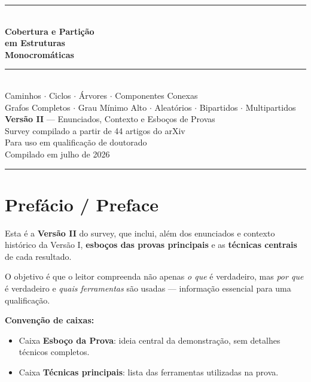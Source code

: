 \documentclass[12pt,a4paper,twoside,openright]{book}
\theoremstyle{definition}
\begin{document}
\begin{titlepage}
\centering
\vspace*{2cm}
{\color{darkblue}\rule{\linewidth}{2pt}}\\[0.5cm]
{\Huge\bfseries\color{darkblue}
  Cobertura e Partição\\[4pt]
  em Estruturas\\[4pt]
  Monocromáticas}\\[0.8cm]
{\color{accent}\rule{\linewidth}{1pt}}\\[0.6cm]
{\large Caminhos $\cdot$ Ciclos $\cdot$ Árvores $\cdot$ Componentes Conexas}\\[0.3cm]
{\normalsize Grafos Completos $\cdot$ Grau Mínimo Alto $\cdot$ Aleatórios $\cdot$ Bipartidos $\cdot$ Multipartidos}\\[2cm]
{\large\textbf{Versão II} — Enunciados, Contexto e Esboços de Provas}\\[0.4cm]
{\normalsize Survey compilado a partir de 44 artigos do arXiv}\\[0.3cm]
{\normalsize Para uso em qualificação de doutorado}\\[2.5cm]
{\normalsize Compilado em julho de 2026}
\vfill
{\color{darkblue}\rule{\linewidth}{2pt}}
\end{titlepage}

\frontmatter
\tableofcontents
\cleardoublepage

\chapter*{Prefácio / Preface}


Esta é a \textbf{Versão II} do survey, que inclui, além dos enunciados e contexto histórico da Versão I,
\textbf{esboços das provas principais} e as \textbf{técnicas centrais} de cada resultado.

O objetivo é que o leitor compreenda não apenas \emph{o que} é verdadeiro, mas \emph{por que} é verdadeiro
e \emph{quais ferramentas} são usadas — informação essencial para uma qualificação.

\medskip
\noindent\textbf{Convenção de caixas:}
\begin{itemize}
  \item Caixa \textbf{Esboço da Prova}: ideia central da demonstração, sem detalhes técnicos completos.
  \item Caixa \textbf{Técnicas principais}: lista das ferramentas utilizadas na prova.
\end{itemize}
\end{document}
